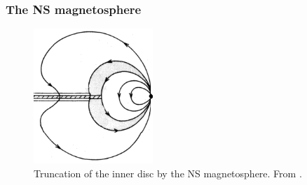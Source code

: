 \documentclass[a4paper,12pt,onecolumn]{article}
\makeatletter
\newcommand*{\bh}{BH\@\xspace}
\makeatother
\begin{document}




\subsubsection*{The NS magnetosphere}

\begin{figure}
\vspace*{-1cm}
\hspace*{0.1cm}
\includegraphics[height=5.1cm]{Figures/ghosh_lamb.png}
\caption{Truncation of the inner disc by the NS magnetosphere. From \cite{Ghosh1978}.}
\label{fig:ghosh}
\end{figure} 
\end{document}
